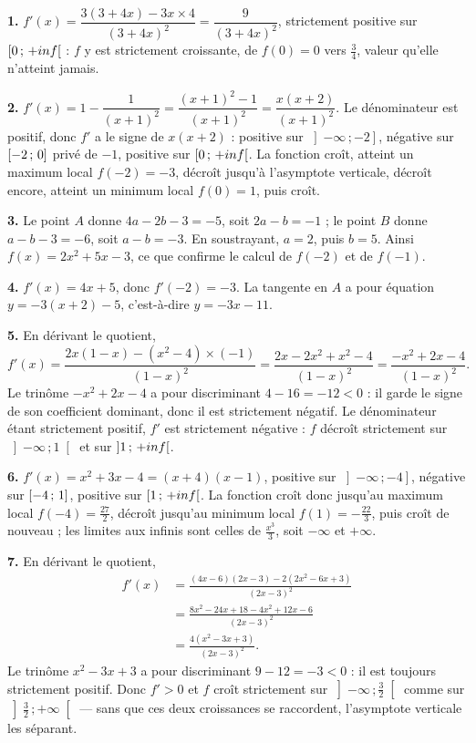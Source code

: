 \begin{corrige}[annales]
\textbf{1.} $f'(x) = \dfrac{3(3+4x)-3x \times 4}{(3+4x)^{2}}
= \dfrac{9}{(3+4x)^{2}}$, strictement positive sur
$\left[0\,;\,+inf\right[$ : $f$ y est strictement croissante, de
$f(0) = 0$ vers $\frac34$, valeur qu'elle n'atteint jamais.

\textbf{2.} $f'(x) = 1-\dfrac{1}{(x+1)^{2}}
= \dfrac{(x+1)^{2}-1}{(x+1)^{2}} = \dfrac{x(x+2)}{(x+1)^{2}}$. Le
dénominateur est positif, donc $f'$ a le signe de $x(x+2)$ : positive sur
$\left]-\infty\,;-2\right]$, négative sur $\left[-2\,;\,0\right]$ privé de
$-1$, positive sur $\left[0\,;\,+inf\right[$. La fonction croît, atteint un
maximum local $f(-2) = -3$, décroît jusqu'à l'asymptote verticale, décroît
encore, atteint un minimum local $f(0) = 1$, puis croît.

\textbf{3.} Le point $A$ donne $4a-2b-3 = -5$, soit $2a-b = -1$ ; le point
$B$ donne $a-b-3 = -6$, soit $a-b = -3$. En soustrayant, $a = 2$, puis
$b = 5$. Ainsi $f(x) = 2x^{2}+5x-3$, ce que confirme le calcul de $f(-2)$ et
de $f(-1)$.

\textbf{4.} $f'(x) = 4x+5$, donc $f'(-2) = -3$. La tangente en $A$ a pour
équation $y = -3\left(x+2\right)-5$, c'est-à-dire $y = -3x-11$.

\textbf{5.} En dérivant le quotient,
\[
  f'(x) = \frac{2x(1-x)-\left(x^{2}-4\right)\times(-1)}{(1-x)^{2}}
  = \frac{2x-2x^{2}+x^{2}-4}{(1-x)^{2}}
  = \frac{-x^{2}+2x-4}{(1-x)^{2}} .
\]
Le trinôme $-x^{2}+2x-4$ a pour discriminant $4-16 = -12 < 0$ : il garde le
signe de son coefficient dominant, donc il est strictement négatif. Le
dénominateur étant strictement positif, $f'$ est strictement négative :
$f$ décroît strictement sur $\left]-\infty\,;1\right[$ et sur
$\left]1\,;\,+inf\right[$.

\textbf{6.} $f'(x) = x^{2}+3x-4 = (x+4)(x-1)$, positive sur
$\left]-\infty\,;-4\right]$, négative sur $\left[-4\,;\,1\right]$, positive sur
$\left[1\,;\,+inf\right[$. La fonction croît donc jusqu'au maximum local
$f(-4) = \frac{27}{2}$, décroît jusqu'au minimum local
$f(1) = -\frac{22}{3}$, puis croît de nouveau ; les limites aux infinis sont
celles de $\frac{x^{3}}{3}$, soit $-\infty$ et $+\infty$.

\textbf{7.} En dérivant le quotient,
\[
\begin{aligned}
  f'(x) &= \frac{(4x-6)(2x-3)-2\left(2x^{2}-6x+3\right)}{(2x-3)^{2}}\\
  &= \frac{8x^{2}-24x+18-4x^{2}+12x-6}{(2x-3)^{2}}\\
  &= \frac{4\left(x^{2}-3x+3\right)}{(2x-3)^{2}} .
\end{aligned}
\]
Le trinôme $x^{2}-3x+3$ a pour discriminant $9-12 = -3<0$ : il est toujours
strictement positif. Donc $f'>0$ et $f$ croît strictement sur
$\left]-\infty\,;\frac32\right[$ comme sur
$\left]\frac32\,;+\infty\right[$ — sans que ces deux croissances se
raccordent, l'asymptote verticale les séparant.


\end{corrige}
